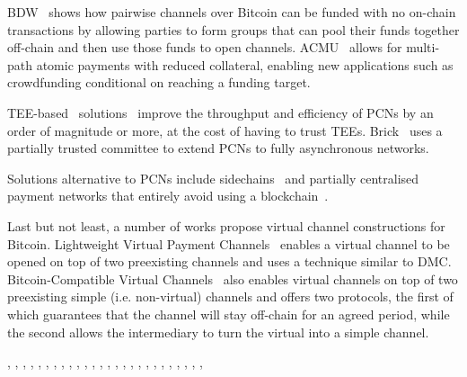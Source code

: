  BDW~\cite{scalable-funding} shows how pairwise channels over Bitcoin can be
  funded with no on-chain transactions by allowing parties to form groups that
  can pool their funds together off-chain and then use those funds to open
  channels. ACMU~\cite{10.1145/3319535.3345666} allows for multi-path atomic
  payments with reduced collateral, enabling new applications such as
  crowdfunding conditional on reaching a funding target.

  TEE-based~\cite{zhao2019sok}
  solutions~\cite{teechan,10.1145/3341301.3359627,liao2021speedster,lee2020routee}
  improve the throughput and efficiency of PCNs by an order of magnitude or
  more, at the cost of having to trust TEEs. Brick~\cite{avarikioti2020brick}
  uses a partially trusted committee to extend PCNs to fully asynchronous
  networks.

  Solutions alternative to PCNs include sidechains~\cite{cryptoeprint:2020:175}
  and partially centralised payment networks that entirely avoid using a
  blockchain~\cite{DBLP:conf/trust/ArmknechtKMYZ15,stellar,silentwhispers,DBLP:conf/ndss/RoosMKG18}.

  Last but not least, a number of works propose virtual channel constructions
  for Bitcoin. Lightweight Virtual Payment
  Channels~\cite{10.1007/978-3-030-65411-5_18} enables a virtual channel to be
  opened on top of two preexisting channels and uses a technique similar to DMC.
  Bitcoin-Compatible Virtual Channels~\cite{cryptoeprint:2020:554} also enables
  virtual channels on top of two preexisting simple (i.e. non-virtual) channels
  and offers two protocols, the first of which guarantees that the channel will
  stay off-chain for an agreed period, while the second allows the intermediary
  to turn the virtual into a simple channel.

  \cite{DBLP:conf/fc/GudgeonMRMG20}, \cite{spider}, \cite{lightning},
  \cite{raiden}, \cite{bitcoin}, \cite{scaling}, \cite{decker},
  \cite{DBLP:conf/trust/ArmknechtKMYZ15}, \cite{stellar}, \cite{silentwhispers},
  \cite{DBLP:conf/ndss/RoosMKG18}, \cite{DBLP:conf/ccs/DziembowskiFH18},
  \cite{perun}, \cite{teechan}, \cite{sprites}, \cite{prihodko2016flare},
  \cite{DBLP:conf/ndss/MalavoltaMSKM19}, \cite{cryptoeprint:2020:175},
  \cite{cryptoeprint:2020:554}, \cite{cryptoeprint:2020:476},
  \cite{avarikioti2020brick}, \cite{10.1145/3319535.3345666},
  \cite{10.1007/978-3-030-65411-5_18}, \cite{cryptoeprint:2020:299},
  \cite{dong2018celer}, \cite{10.1145/3341301.3359627}, \cite{liao2021speedster}
